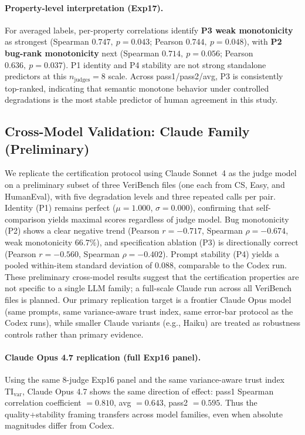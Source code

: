 \documentclass[numbers]{article}
\begin{document}
\paragraph{Property-level interpretation (Exp17).}
For averaged labels, per-property correlations identify
\textbf{P3 weak monotonicity} as strongest (Spearman \(0.747,\ p=0.043\); Pearson \(0.744,\ p=0.048\)),
with \textbf{P2 bug-rank monotonicity} next (Spearman \(0.714,\ p=0.056\); Pearson \(0.636,\ p=0.037\)).
P1 identity and P4 stability are not strong standalone predictors at this \(n_\text{judges}=8\) scale.
Across pass1/pass2/avg, P3 is consistently top-ranked, indicating that semantic monotone behavior under controlled degradations is the most stable predictor of human agreement in this study.

\subsection{Cross-Model Validation: Claude Family (Preliminary)}
We replicate the certification protocol using Claude Sonnet~4 as the judge model on a preliminary subset of three VeriBench files (one each from CS, Easy, and HumanEval), with five degradation levels and three repeated calls per pair.
Identity (P1) remains perfect ($\mu=1.000$, $\sigma=0.000$), confirming that self-comparison yields maximal scores regardless of judge model.
Bug monotonicity (P2) shows a clear negative trend (Pearson $r=-0.717$, Spearman $\rho=-0.674$, weak monotonicity $66.7\%$), and specification ablation (P3) is directionally correct (Pearson $r=-0.560$, Spearman $\rho=-0.402$).
Prompt stability (P4) yields a pooled within-item standard deviation of $0.088$, comparable to the Codex run.
These preliminary cross-model results suggest that the certification properties are not specific to a single LLM family; a full-scale Claude run across all VeriBench files is planned.
Our primary replication target is a frontier Claude Opus model (same prompts, same variance-aware trust index, same error-bar protocol as the Codex runs), while smaller Claude variants (e.g., Haiku) are treated as robustness controls rather than primary evidence.

\paragraph{Claude Opus 4.7 replication (full Exp16 panel).}
Using the same \(8\)-judge Exp16 panel and the same variance-aware trust index
\(\mathrm{TI}_{\mathrm{var}}\),
Claude Opus 4.7 shows the same direction of effect:
pass1 Spearman correlation coefficient \(=0.810\), avg \(=0.643\), pass2 \(=0.595\).
Thus the quality+stability framing transfers across model families, even when absolute magnitudes differ from Codex.
\end{document}
